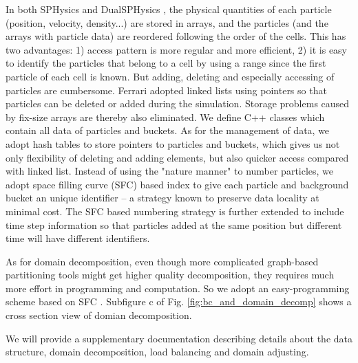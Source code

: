 \documentclass[journal abbreviation, manuscript]{copernicus}
\begin{document}
In both SPHysics and DualSPHysics \citep {crespo2015dualsphysics}, the physical quantities of each particle (position, velocity, density...) are stored in arrays, and the particles (and the arrays with particle data) are reordered following the order of the cells. This has two advantages: 1) access pattern is more regular and more efficient, 2) it is easy to identify the particles that belong to a cell by using a range since the first particle of each cell is known. But adding, deleting and especially accessing of particles are cumbersome. Ferrari \citep {ferrari2009new} adopted linked lists using pointers so that particles can be deleted or added during the simulation. Storage problems caused by fix-size arrays are thereby also eliminated. We define C++ classes which contain all data of particles and buckets. As for the management of data, we adopt hash tables to store pointers to particles and buckets, which gives us not only flexibility of deleting and adding elements, but also quicker access compared with linked list. Instead of using the "nature manner" to number particles, we adopt space filling curve (SFC) based index to give each particle and background bucket an unique identifier -- a strategy known to preserve data locality at minimal cost. The SFC based numbering strategy is further extended to include time step information so that particles added at the same position but different time will have different identifiers. 

As for domain decomposition, even though more complicated graph-based partitioning tools \citep {biswas1999experiments} might get higher quality decomposition, they requires much more effort in programming and computation. So we adopt an easy-programming scheme based on SFC \citep {patra1999efficient}. Subfigure c of Fig. \ref{fig:bc_and_domain_decomp} shows a cross section view of domian decomposition.

We will provide a supplementary documentation describing details about the data structure, domain decomposition, load balancing and domain adjusting.
\end{document}
